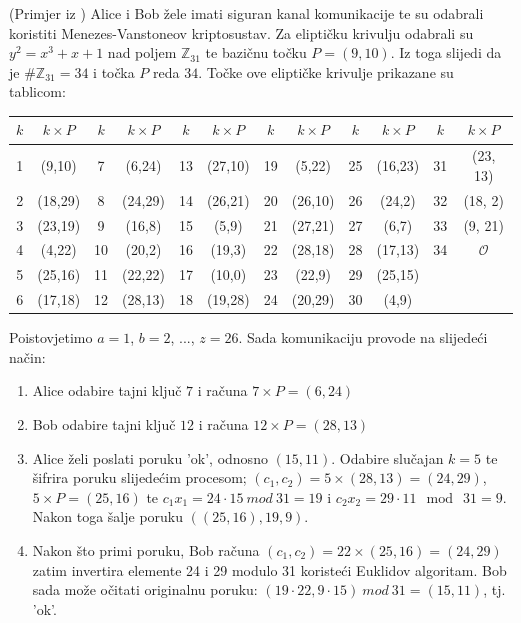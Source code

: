 \documentclass{mathos}
\begin{document}
\begin{primjer}
    (Primjer iz \cite{ECL})
    Alice i Bob žele imati siguran kanal komunikacije te su odabrali koristiti Menezes-Vanstoneov kriptosustav. Za eliptičku krivulju odabrali su $y^2 = x^3 + x + 1$ nad poljem $\mathbb{Z}_{31}$ te bazičnu točku $P = (9, 10)$. Iz toga slijedi da je $\#\mathbb{Z}_{31} = 34$ i točka $P$ reda $34$. Točke ove eliptičke krivulje prikazane su tablicom:
    \begin{table}[h]
        \centering
        \begin{tabular}{|c|c|c|c|c|c|c|c|c|c|c|c|}
        \hline
        $k$ & $k \times P$ & $k$ & $k \times P$ & $k$ & $k \times P$ & $k$ & $k \times P$ & $k$ & $k \times P$ & $k$ & $k \times P$ \\
        \hline
        1 & (9,10) & 7 & (6,24) & 13 & (27,10) & 19 & (5,22) & 25 & (16,23) & 31 & (23, 13) \\
        2 & (18,29) & 8 & (24,29) & 14 & (26,21) & 20 & (26,10) & 26 & (24,2) & 32 & (18, 2) \\
        3 & (23,19) & 9 & (16,8) & 15 & (5,9) & 21 & (27,21) & 27 & (6,7) & 33 & (9, 21)\\
        4 & (4,22) & 10 & (20,2) & 16 & (19,3) & 22 & (28,18) & 28 & (17,13) & 34 & $\mathcal{O}$ \\
        5 & (25,16) & 11 & (22,22) & 17 & (10,0) & 23 & (22,9) & 29 & (25,15) & & \\
        6 & (17,18) & 12 & (28,13) & 18 & (19,28) & 24 & (20,29) & 30 & (4,9) & & \\ 
        \hline
        \end{tabular}
    \end{table}
    Poistovjetimo $a = 1$, $b = 2$, ..., $z = 26$. Sada komunikaciju provode na slijedeći način:
    \begin{enumerate}
        \item Alice odabire tajni ključ $7$ i računa $7 \times P = (6, 24)$
        \item Bob odabire tajni ključ $12$ i računa $12 \times P = (28, 13)$
        \item Alice želi poslati poruku 'ok', odnosno $(15, 11)$. Odabire slučajan $k = 5$ te šifrira poruku slijedećim procesom; $(c_1, c_2) = 5 \times (28, 13) = (24, 29)$, $5 \times P = (25, 16)$ te $c_1 x_1 = 24\cdot 15 \ mod \ 31 = 19$ i $c_2 x_2 = 29\cdot 11 \mod \ 31 = 9$. Nakon toga šalje poruku $((25, 16), 19, 9)$.
        \item Nakon što primi poruku, Bob računa $(c_1, c_2) = 22 \times (25, 16) = (24, 29)$ zatim invertira elemente 24 i 29 modulo 31 koristeći Euklidov algoritam. Bob sada može očitati originalnu poruku: $(19\cdot 22, 9 \cdot 15) \ mod \ 31 = (15, 11)$, tj. 'ok'.
    \end{enumerate}
\end{primjer}
\end{document}
